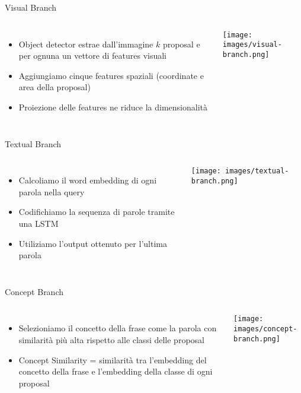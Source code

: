 \documentclass{beamer}
\begin{document}
\begin{frame}{Visual Branch}
  \begin{columns}
      \begin{itemize}
        \item Object detector estrae dall'immagine $k$ proposal e per
        ognuna un vettore di \alert{features visuali}
        \item Aggiungiamo cinque \alert{features spaziali} (coordinate e
        area della proposal)
        \item \alert{Proiezione} delle features ne riduce la dimensionalità
      \end{itemize}
      \centering
      \texttt{[image: images/visual-branch.png]}
  \end{columns}
\end{frame}

\begin{frame}{Textual Branch}
  \begin{columns}
      \begin{itemize}
        \item Calcoliamo il \alert{word embedding} di ogni parola nella query
        \item Codifichiamo la \alert{sequenza} di parole tramite una LSTM
        \item Utiliziamo l'output ottenuto per \alert{l'ultima} parola
      \end{itemize}
      \centering
      \texttt{[image: images/textual-branch.png]}
  \end{columns}
\end{frame}

\begin{frame}{Concept Branch}
  \begin{columns}
      \begin{itemize}
        \item Selezioniamo il \alert{concetto} della frase come la
        \alert{parola} con similarità più alta rispetto alle classi
        delle proposal
        \item Concept Similarity = similarità tra \alert{l'embedding del
        concetto} della frase e \alert{l'embedding della classe} di ogni
        proposal
      \end{itemize}
      \centering
      \texttt{[image: images/concept-branch.png]}
  \end{columns}
\end{frame}
\end{document}
